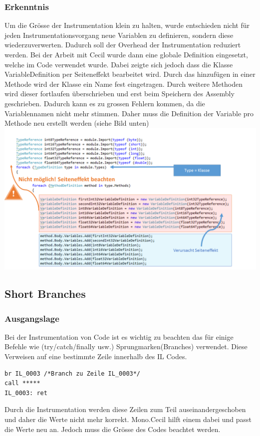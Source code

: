 \documentclass[10pt,a4paper]{article}
\begin{document}
\subsubsection{Erkenntnis}
\begin{flushleft}
Um die Grösse der Instrumentation klein zu halten, wurde entschieden nicht für jeden Instrumentationsvorgang neue Variablen zu definieren, sondern diese wiederzuverwerten. Dadurch soll der Overhead der Instrumentation reduziert werden.
Bei der Arbeit mit Cecil wurde dann eine globale Definition eingesetzt, welche im Code verwendet wurde.
Dabei zeigte sich jedoch dass die Klasse VariableDefinition per Seiteneffekt bearbeitet wird. Durch das hinzufügen in einer Methode wird der Klasse ein Name fest eingetragen. Durch weitere Methoden wird dieser fortlaufen überschrieben und erst beim Speichern des Assembly geschrieben. Dadurch kann es zu grossen Fehlern kommen, da die Variablennamen nicht mehr stimmen.
Daher muss die Definition der Variable pro Methode neu erstellt werden (siehe Bild unten)
\includegraphics[width=14cm, clip]{pictures/VariableDefinition.png}
\end{flushleft} \newpage
\subsection{Short Branches}
\subsubsection{Ausgangslage}
\begin{flushleft}
Bei der Instrumentation von Code ist es wichtig zu beachten das für einige Befehle wie (try/catch/finally usw.) Sprungmarken(Branches) verwendet. Diese Verweisen auf eine bestimmte Zeile innerhalb des IL Codes.
\begin{lstlisting} 
br IL_0003 /*Branch zu Zeile IL_0003*/
call *****
IL_0003: ret
\end{lstlisting}
Durch die Instrumentation werden diese Zeilen zum Teil auseinandergeschoben und daher die Werte nicht mehr korrekt. Mono.Cecil hilft einem dabei und passt die Werte neu an.
Jedoch muss die Grösse des Codes beachtet werden.
\end{flushleft}
\end{document}
